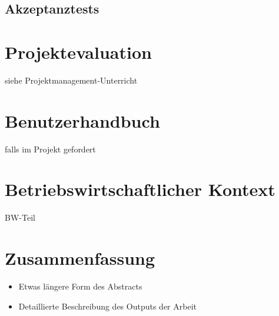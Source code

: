 \section{Akzeptanztests}

\chapter{Projektevaluation}
siehe Projektmanagement-Unterricht

\chapter{Benutzerhandbuch} 
falls im Projekt gefordert

\chapter{Betriebswirtschaftlicher Kontext}
BW-Teil

\chapter{Zusammenfassung}
\begin{itemize}
	\item Etwas längere Form des Abstracts
	\item Detaillierte Beschreibung des Outputs der Arbeit
\end{itemize}